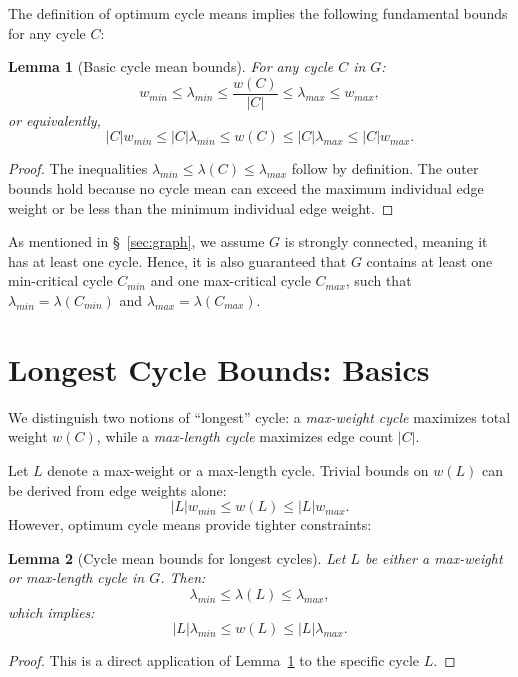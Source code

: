 \documentclass{article}
\newtheorem{lem}{Lemma}[section]
\theoremstyle{definition}
\begin{document}
The definition of optimum cycle means implies the following
fundamental bounds for any cycle $C$:
\begin{lem}[Basic cycle mean bounds]
\label{lem:basic-bounds}
For any cycle $C$ in $G$:
\begin{equation}
  \label{eq:anycycle1}
  w_{min} \leq \lambda_{min} \leq \frac{w(C)}{|C|} \leq \lambda_{max} \leq w_{max},
\end{equation}
or equivalently,
\begin{equation}
  \label{eq:anycycle2}
  |C|w_{min} \leq |C|\lambda_{min} \leq w(C) \leq |C|\lambda_{max} \leq |C|w_{max}.
\end{equation}
\end{lem}
\begin{proof}
The inequalities $\lambda_{min} \leq \lambda(C) \leq \lambda_{max}$
follow by definition. The outer bounds hold because no cycle mean can
exceed the maximum individual edge weight or be less than the minimum
individual edge weight.
\end{proof}

As mentioned in \S~\ref{sec:graph}, we assume $G$ is strongly
connected, meaning it has at least one cycle. Hence, it is also
guaranteed that $G$ contains at least one min-critical cycle $C_{min}$
and one max-critical cycle $C_{max}$, such that $\lambda_{min} =
\lambda(C_{min})$ and $\lambda_{max} = \lambda(C_{max})$.

\section{Longest Cycle Bounds: Basics}
\label{sec:longest-basics}

We distinguish two notions of ``longest'' cycle: a \textit{max-weight
cycle} maximizes total weight $w(C)$, while a \textit{max-length cycle}
maximizes edge count $|C|$.

Let $L$ denote a max-weight or a max-length cycle. Trivial bounds on
$w(L)$ can be derived from edge weights alone:
\begin{equation}
  |L|w_{min} \leq w(L) \leq |L|w_{max}.
\end{equation}
However, optimum cycle means provide tighter constraints:
\begin{lem}[Cycle mean bounds for longest cycles]
\label{lem:longest-mean-bounds}
Let $L$ be either a max-weight or max-length cycle in $G$. Then:
\begin{equation}
  \label{eq:longest1}
  \lambda_{min} \leq \lambda(L) \leq \lambda_{max},
\end{equation}
which implies:
\begin{equation}
  \label{eq:longest2}
  |L|\lambda_{min} \leq w(L) \leq |L|\lambda_{max}.
\end{equation}
\end{lem}
\begin{proof}
This is a direct application of Lemma~\ref{lem:basic-bounds} to the
specific cycle $L$.
\end{proof}
\end{document}
